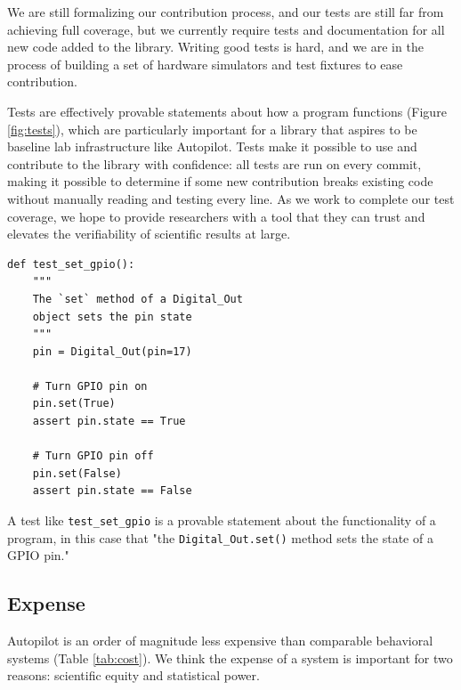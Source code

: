 We are still formalizing our contribution process, and our tests are still far from achieving full coverage, but we currently require tests and documentation for all new code added to the library. Writing good tests is hard, and we are in the process of building a set of hardware simulators and test fixtures to ease contribution.  

Tests are effectively provable statements about how a program functions (Figure \ref{fig:tests}), which are particularly important for a library that aspires to be baseline lab infrastructure like Autopilot. Tests make it possible to use and contribute to the library with confidence: all tests are run on every commit, making it possible to determine if some new contribution breaks existing code without manually reading and testing every line. As we work to complete our test coverage, we hope to provide researchers with a tool that they can trust and elevates the verifiability of scientific results at large.

\begin{marginfigure}[-7cm]
\begin{verbatim}
def test_set_gpio():
    """
    The `set` method of a Digital_Out
    object sets the pin state
    """
    pin = Digital_Out(pin=17)

    # Turn GPIO pin on
    pin.set(True)
    assert pin.state == True

    # Turn GPIO pin off
    pin.set(False)
    assert pin.state == False
\end{verbatim}
\caption{A test like \texttt{test\_set\_gpio} is a provable statement about the functionality of a program, in this case that "the \texttt{Digital\_Out.set()} method sets the state of a GPIO pin."}
\label{fig:tests}
\end{marginfigure}

\subsection{Expense}
\label{sec:expense}

Autopilot is an order of magnitude less expensive than comparable behavioral systems (Table \ref{tab:cost}). We think the expense of a system is important for two reasons: scientific equity and statistical power. 

